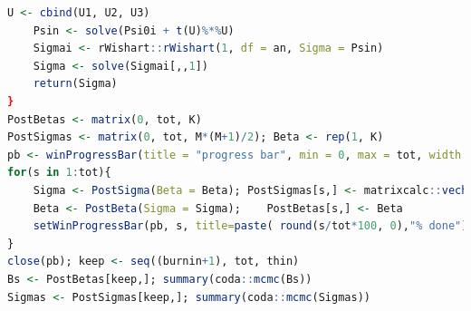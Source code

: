 \begin{enumerate}[leftmargin=*]
\begin{tcolorbox}[enhanced,width=4.67in,center upper,
	fontupper=\large\bfseries,drop shadow southwest,sharp corners]
\begin{VF}
\begin{lstlisting}[language=R]
	U <- cbind(U1, U2, U3)
	Psin <- solve(Psi0i + t(U)%*%U)
	Sigmai <- rWishart::rWishart(1, df = an, Sigma = Psin)
	Sigma <- solve(Sigmai[,,1]) 
	return(Sigma)
}
PostBetas <- matrix(0, tot, K)
PostSigmas <- matrix(0, tot, M*(M+1)/2); Beta <- rep(1, K)
pb <- winProgressBar(title = "progress bar", min = 0, max = tot, width = 300)
for(s in 1:tot){
	Sigma <- PostSigma(Beta = Beta); PostSigmas[s,] <- matrixcalc::vech(Sigma)
	Beta <- PostBeta(Sigma = Sigma); 	PostBetas[s,] <- Beta
	setWinProgressBar(pb, s, title=paste( round(s/tot*100, 0),"% done"))
}
close(pb); keep <- seq((burnin+1), tot, thin)
Bs <- PostBetas[keep,]; summary(coda::mcmc(Bs))
Sigmas <- PostSigmas[keep,]; summary(coda::mcmc(Sigmas))
\end{lstlisting}
	\end{VF}
\end{tcolorbox} 


\end{enumerate}
